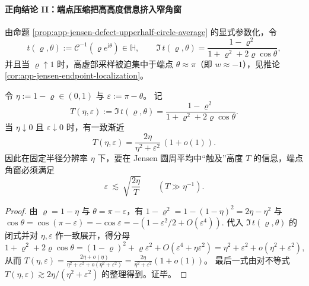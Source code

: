 \paragraph{正向结论 II：端点压缩把高高度信息挤入窄角窗}
由命题 \ref{prop:app-jensen-defect-upperhalf-circle-average} 的显式参数化，令
\[
t(\varrho,\theta):=\mathcal{C}^{-1}(\varrho e^{\mathrm{i}\theta})\in\mathbb{H},
\qquad
\Im\,t(\varrho,\theta)=\frac{1-\varrho^2}{1+\varrho^2+2\varrho\cos\theta},
\]
并且当 \(\varrho\uparrow 1\) 时，高虚部采样被迫集中于端点 \(\theta\approx\pi\)（即 \(w\approx-1\)），见推论 \ref{cor:app-jensen-endpoint-localization}。

\begin{theorem}\label{thm:xi-endpoint-angle-height-exchange}
令 \(\eta:=1-\varrho\in(0,1)\) 与 \(\varepsilon:=\pi-\theta\)。
记
\[
T(\eta,\varepsilon):=\Im\,t(\varrho,\theta)=\frac{1-\varrho^2}{1+\varrho^2+2\varrho\cos\theta}.
\]
当 \(\eta\downarrow 0\) 且 \(\varepsilon\downarrow 0\) 时，有一致渐近
\[
T(\eta,\varepsilon)=\frac{2\eta}{\eta^2+\varepsilon^2}\,(1+o(1)).
\]
因此在固定半径分辨率 \(\eta\) 下，要在 Jensen 圆周平均中“触及”高度 \(T\) 的信息，端点角窗必须满足
\[
\varepsilon \ \lesssim\ \sqrt{\frac{2\eta}{T}}
\qquad (T\gg \eta^{-1}).
\]
\end{theorem}
\begin{proof}
由 \(\varrho=1-\eta\) 与 \(\theta=\pi-\varepsilon\)，有
\(
1-\varrho^2=1-(1-\eta)^2=2\eta-\eta^2
\)
与
\(
\cos\theta=\cos(\pi-\varepsilon)=-\cos\varepsilon=-(1-\varepsilon^2/2+O(\varepsilon^4)).
\)
代入 \(\Im\,t(\varrho,\theta)\) 的闭式并对 \(\eta,\varepsilon\) 作一致展开，得分母
\[
1+\varrho^2+2\varrho\cos\theta
=(1-\varrho)^2+\varrho\varepsilon^2+O(\varepsilon^4+\eta\varepsilon^2)
=\eta^2+\varepsilon^2+o(\eta^2+\varepsilon^2),
\]
从而
\(
T(\eta,\varepsilon)=\frac{2\eta+o(\eta)}{\eta^2+\varepsilon^2+o(\eta^2+\varepsilon^2)}
=\frac{2\eta}{\eta^2+\varepsilon^2}(1+o(1))
\)。
最后一式由对不等式 \(T(\eta,\varepsilon)\gtrsim 2\eta/(\eta^2+\varepsilon^2)\) 的整理得到。证毕。
\end{proof}

